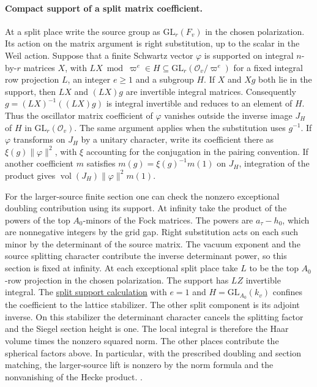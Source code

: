 \paragraph{Compact support of a split matrix coefficient.}
At a split place write the source group as \(\mathrm{GL}_r(F_v)\)
in the chosen polarization. Its action on the matrix argument is
right substitution, up to the scalar in the Weil action. Suppose
that a finite Schwartz vector \(\varphi\) is supported on integral
\(n\)-by-\(r\) matrices \(X\), with
\(LX\bmod\varpi^e\in H\subseteq\mathrm{GL}_r(\mathcal O_v/\varpi^e)\)
for a fixed integral row projection \(L\), an integer \(e\ge1\)
and a subgroup \(H\). If \(X\) and \(Xg\) both lie in the support,
then \(LX\) and \((LX)g\) are invertible integral matrices.
Consequently \(g=(LX)^{-1}((LX)g)\) is integral invertible and
reduces to an element of \(H\). Thus the oscillator matrix
coefficient of \(\varphi\) vanishes outside the inverse image
\(J_H\) of \(H\) in \(\mathrm{GL}_r(\mathcal O_v)\). The same
argument applies when the substitution uses \(g^{-1}\).
If \(\varphi\) transforms on \(J_H\) by a unitary character, write
its coefficient there as \(\xi(g)\|\varphi\|^2\), with \(\xi\)
accounting for the conjugation in the pairing convention.
If another coefficient \(m\) satisfies \(m(g)=\xi(g)^{-1}m(1)\)
on \(J_H\), integration of the product gives
\(\operatorname{vol}(J_H)\|\varphi\|^2m(1)\).

For the larger-source finite section one can check the nonzero
exceptional doubling contribution using its support. At infinity
take the product of the powers of the top \(A_0\)-minors of the
Fock matrices. The powers are \(a_\tau-h_0\), which are nonnegative
integers by the grid gap. Right substitution acts on each such minor
by the determinant of the source matrix. The vacuum exponent and
the source splitting character contribute the inverse determinant
power, so this section is fixed at infinity. At each exceptional
split place take \(L\) to be the top \(A_0\)-row projection in the
chosen polarization. The support has \(LZ\) invertible integral.
The \hyperlink{proof.split-primitive-support}{split support calculation}
with \(e=1\) and \(H=\mathrm{GL}_{A_0}(k_v)\) confines the coefficient
to the lattice stabilizer. The other split component is its adjoint
inverse. On this stabilizer the determinant character cancels the
splitting factor and the Siegel section height is one. The local
integral is therefore the Haar volume times the nonzero squared
norm. The other places contribute the spherical factors above.
In particular, with the prescribed doubling and section matching, the
larger-source lift is nonzero by the norm formula and the nonvanishing
of the Hecke product.
.

